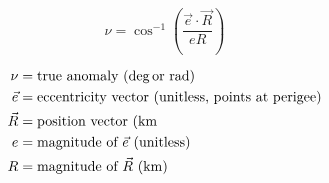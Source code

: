 \documentclass{article}
\begin{document}
\begin{multicols}{3}
	\begin{equation*}
	\boxed{\nu = \cos^{-1} \left(\dfrac{\vec{e}\cdot\vec{R}}{eR}\right)}
	\end{equation*}

	\vfill\null
	\columnbreak

	\begin{align*}
	\nu &= \text{true anomaly (\si{\deg \text{or } \radian})}\\
	\vec{e} &= \text{eccentricity vector (unitless, points at perigee)}\\
	\vec{R} &= \text{position vector (\si{\kilo\meter}}\\
	e &= \text{magnitude of $\vec{e}$ (unitless)}\\
	R &= \text{magnitude of $\vec{R}$ (\si{\kilo\meter})}\\
	\end{align*}
\end{multicols}
\end{document}

